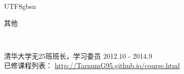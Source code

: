 \documentclass[9pt]{article}
\newenvironment{changemargin}[2]{%
  \begin{list}{}{%
    \setlength{\topsep}{0pt}%
    \setlength{\leftmargin}{#1}%
    \setlength{\rightmargin}{#2}%
    \setlength{\listparindent}{\parindent}%
    \setlength{\itemindent}{\parindent}%
    \setlength{\parsep}{\parskip}%
  }%
  \item[]}{\end{list}
}
\newcommand{\lineover}{
	\begin{changemargin}{-0.05in}{-0.05in}
		\vspace*{-8pt}
		\hrulefill \\
		\vspace*{-2pt}
	\end{changemargin}
}
\newcommand{\header}[1]{
	\begin{changemargin}{-0.5in}{-0.5in}
		\scshape{#1}\\
  	\lineover
	\end{changemargin}
}
\newenvironment{body} {
	\vspace*{-16pt}
	\begin{changemargin}{-0.25in}{-0.5in}
  }	
	{\end{changemargin}
}
\begin{document}
\begin{CJK*}{UTF8}{gbsn}


\header{其他}

\begin{body}
	\vspace{14pt}
	清华大学无25班班长，学习委员 \hfill 2012.10 - 2014.9\\
	\smallskip
	已修课程列表： \href{tarnumg95.github.io/course.html}{http://TarnumG95.github.io/course.html}\\


\end{body}

\smallskip
\smallskip

\end{CJK*}
\end{document}
